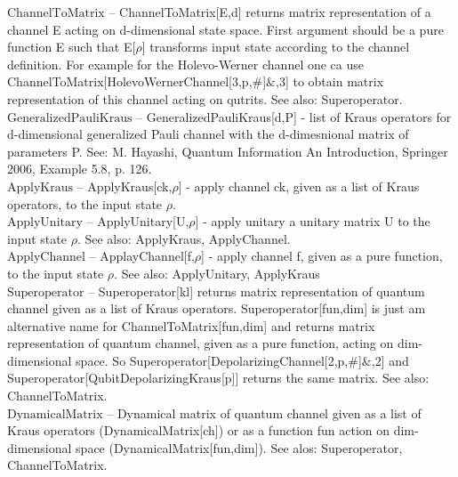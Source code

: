 \noindent\textbf{$ \text{ChannelToMatrix} $ }-- ChannelToMatrix[E,d] returns matrix representation of a channel E acting on d-dimensional state space. First argument should be a pure function E such that E[$\rho $] transforms input state according to the channel definition. For example for the Holevo-Werner channel one ca use ChannelToMatrix[HolevoWernerChannel[3,p,$\#$]$\&$,3] to obtain matrix representation of this channel acting on qutrits. See also: Superoperator.$  $\\

\noindent\textbf{$ \text{GeneralizedPauliKraus} $ }-- GeneralizedPauliKraus[d,P] - list of Kraus operators for d-dimensional generalized Pauli channel with the d-dimesnional matrix of parameters P. See: M. Hayashi, Quantum Information An Introduction, Springer 2006, Example 5.8, p. 126.$  $\\

\noindent\textbf{$ \text{ApplyKraus} $ }-- ApplyKraus[ck,$\rho $] - apply channel ck, given as a list of Kraus operators, to the input state $\rho $.$  $\\

\noindent\textbf{$ \text{ApplyUnitary} $ }-- ApplyUnitary[U,$\rho $] - apply unitary a unitary matrix U to the input state $\rho $. See also: ApplyKraus, ApplyChannel.$  $\\

\noindent\textbf{$ \text{ApplyChannel} $ }-- ApplayChannel[f,$\rho $] - apply channel f, given as a pure function, to the input state $\rho $. See also: ApplyUnitary, ApplyKraus$  $\\

\noindent\textbf{$ \text{Superoperator} $ }-- Superoperator[kl] returns matrix representation of quantum channel given as a list of Kraus operators. Superoperator[fun,dim] is just am alternative name for ChannelToMatrix[fun,dim] and returns matrix representation of quantum channel, given as a pure function, acting on dim-dimensional space. So Superoperator[DepolarizingChannel[2,p,$\#$]$\&$,2] and Superoperator[QubitDepolarizingKraus[p]] returns the same matrix. See also: ChannelToMatrix.$  $\\

\noindent\textbf{$ \text{DynamicalMatrix} $ }-- Dynamical matrix of quantum channel given as a list of Kraus operators (DynamicalMatrix[ch]) or as a function fun action on dim-dimensional space (DynamicalMatrix[fun,dim]). See alos: Superoperator, ChannelToMatrix.$  $\\

